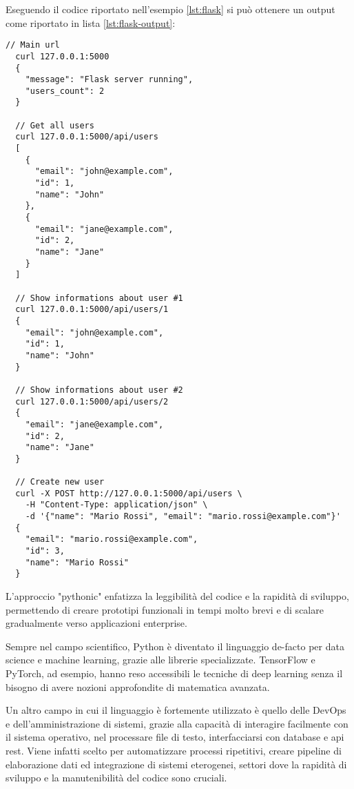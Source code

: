 Eseguendo il codice riportato nell'esempio \ref{lst:flask} si può ottenere un output come riportato
in lista \ref{lst:flask-output}:
\begin{lstlisting}[caption={Output di esempio ottenuto dall'interazione con le rotte disposte dal server web in Flask},
  label=lst:flask-output]
  // Main url
  curl 127.0.0.1:5000
  {
    "message": "Flask server running",
    "users_count": 2
  }

  // Get all users
  curl 127.0.0.1:5000/api/users
  [
    {
      "email": "john@example.com",
      "id": 1,
      "name": "John"
    },
    {
      "email": "jane@example.com",
      "id": 2,
      "name": "Jane"
    }
  ]

  // Show informations about user #1
  curl 127.0.0.1:5000/api/users/1
  {
    "email": "john@example.com",
    "id": 1,
    "name": "John"
  }

  // Show informations about user #2
  curl 127.0.0.1:5000/api/users/2
  {
    "email": "jane@example.com",
    "id": 2,
    "name": "Jane"
  }

  // Create new user
  curl -X POST http://127.0.0.1:5000/api/users \
    -H "Content-Type: application/json" \
    -d '{"name": "Mario Rossi", "email": "mario.rossi@example.com"}'
  {
    "email": "mario.rossi@example.com",
    "id": 3,
    "name": "Mario Rossi"
  }
\end{lstlisting}


L'approccio "pythonic" enfatizza la leggibilità del codice e la rapidità di sviluppo, permettendo di creare prototipi
funzionali in tempi molto brevi e di scalare gradualmente verso applicazioni enterprise.

Sempre nel campo scientifico, Python è diventato il linguaggio de-facto per data science e machine learning,
grazie alle librerie specializzate. TensorFlow e PyTorch, ad esempio, hanno reso accessibili le tecniche di
deep learning senza il bisogno di avere nozioni approfondite di matematica avanzata.

Un altro campo in cui il linguaggio è fortemente utilizzato è quello delle DevOps e dell'amministrazione di sistemi,
grazie alla capacità di interagire facilmente con il sistema operativo, nel processare file di testo, interfacciarsi
con database e \acrshort{api} \acrshort{rest}. Viene infatti scelto per automatizzare processi ripetitivi,
creare pipeline di elaborazione dati ed integrazione di sistemi eterogenei, settori dove la rapidità di sviluppo e la
manutenibilità del codice sono cruciali.


